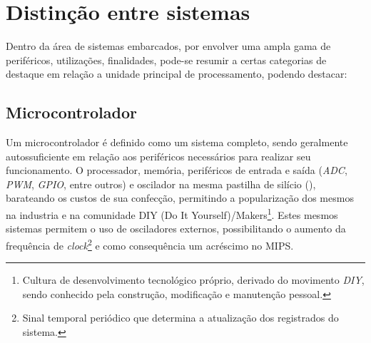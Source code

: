 \section{Distinção entre sistemas}
Dentro da área de sistemas embarcados, por envolver uma ampla gama de periféricos, utilizações, finalidades, pode-se resumir a certas categorias de destaque em relação a unidade principal de processamento, podendo destacar:

\subsection{Microcontrolador}

Um microcontrolador é definido como um sistema completo, sendo geralmente autossuficiente em relação aos periféricos necessários para realizar seu funcionamento. O processador, memória, periféricos de entrada e saída (\textit{ADC}, \textit{PWM}, \textit{GPIO}, entre outros) e oscilador na mesma pastilha de silício (), barateando os custos de sua confecção, permitindo a popularização dos mesmos na industria e na comunidade DIY (Do It Yourself)/Makers\footnote{Cultura de desenvolvimento tecnológico próprio, derivado do movimento \textit{DIY}, sendo conhecido pela construção, modificação e manutenção pessoal.}. Estes mesmos
sistemas permitem o uso de osciladores externos, possibilitando o aumento da frequência de \textit{clock}\footnote{Sinal temporal periódico que determina a atualização dos registrados do sistema.} e como consequência um acréscimo no MIPS.

